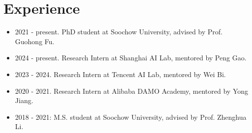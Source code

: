 \documentclass[a4paper,12pt]{article}
\begin{document}
\section{Experience}
\begin{itemize}[leftmargin=18pt]
\item 2021 - present. PhD student at Soochow University, advised by Prof. Guohong Fu.
\item 2024 - present. Research Intern at Shanghai AI Lab, mentored by Peng Gao.
\item 2023 - 2024. Research Intern at Tencent AI Lab, mentored by Wei Bi.
\item 2020 - 2021. Research Intern at Alibaba DAMO Academy, mentored by Yong Jiang.
\item 2018 - 2021: M.S. student at Soochow University, advised by Prof. Zhenghua Li.
\end{itemize}
\end{document}
